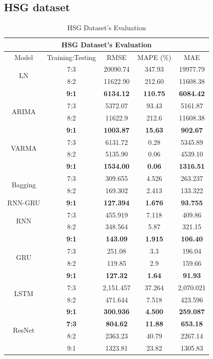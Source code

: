\documentclass{ieeeojies}
\begin{document}
\subsection{HSG dataset} 
\begin{table}[H]
    \centering
    \begin{tabular}{|c|c|c|c|c|}
         \hline
         \multicolumn{5}{|c|}{\textbf{HSG Dataset's Evaluation}}\\
         \hline
         \centering Model & Training:Testing & RMSE & MAPE (\%) & MAE\\
         \hline
         \multirow{2}{*}{LN} & 7:3 & 20090.74 & 347.93 & 19977.79 \\ & 8:2 & 11622.90 & 212.60 & 11608.38 \\ & \textbf{9:1} & \textbf{6134.12} & \textbf{110.75} & \textbf{6084.42}\\
         \hline
         \multirow{2}{*}{ARIMA} & 7:3&5372.07&93.43&5161.87\\ & 8:2&11622.9&212.6&11608.38 \\ & \textbf{9:1} & \textbf{1003.87} & \textbf{15.63} & \textbf{902.67}\\
         \hline
         \multirow{2}{*}{VARMA} & 7:3	& 6131.72 & 0.28 & 5345.89 \\ & 8:2 & 5135.90 & 0.06 & 4539.10 \\ & \textbf{9:1} & \textbf{1534.00}  & \textbf{0.06} & \textbf{1316.51}\\
         \hline
         \multirow{2}{*}{Bagging}  & 7:3 &  309.655 &  4.526 & 263.237 \\  & 8:2 &  169.302 & 2.413 & 133.322 \\ {RNN-GRU}& \textbf{9:1} & \textbf{127.394}  & \textbf{1.676} & \textbf{93.755}\\
         \hline
         \multirow{2}{*}{RNN} & 7:3	& 455.919 & 7.118 & 409.86 \\ & 8:2 & 348.564 & 5.87 & 321.15 \\ & \textbf{9:1} & \textbf{143.09} & \textbf{1.915} & \textbf{106.40}\\
         \hline
         \multirow{2}{*}{GRU} & 7:3 & 251.08&3.3 & 196.04 \\ & 8:2 &119.85	&2.9&159.66\\ & \textbf{9:1} &	\textbf{127.32} & \textbf{1.64} & \textbf{91.93} \\ 
         \hline
         \multirow{2}{*}{LSTM} & 7:3 & 2,151.457 & 37.264 & 2,070.021 \\ & 8:2 & 471.644 &7.518 & 423.596 \\ & \textbf{9:1} &  	\textbf{300.936} &	\textbf{4.500} & 	\textbf{259.087} \\
         \hline
         \multirow{2}{*}{ResNet} & \textbf{7:3} & \textbf{804.62} & \textbf{11.88} & \textbf{653.18}\\ & 8:2 & 2363.23 &  40.79 &  2267.14 \\ & 9:1 & 1323.81 &  23.82 &  1305.83 \\ 
         \hline
    \end{tabular}
    \caption{HSG Dataset's Evaluation}
    \label{mbbresult}
\end{table}
\end{document}
